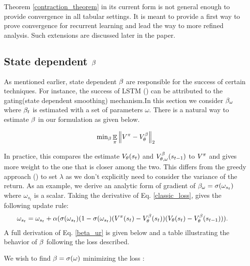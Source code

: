 Theorem \ref{contraction_theorem} in its current form is not general enough to provide convergence in all tabular settings. It is meant to provide a first way to prove convergence for recurrent learning and lead the way to more refined analysis. Such extensions are discussed later in the paper.





\subsection{State dependent $\beta$}
As mentioned earlier, state dependent $\beta$ are responsible for the success of certain techniques. For instance, the success of LSTM (\cite{hochreiter1997long}) can be attributed to the gating(state dependent smoothing) mechanism.In this section we consider $\beta_{\omega}$ where $\beta_t$ is estimated with a set of parameters $\omega$. There is a natural way to estimate $\beta$ in our formulation as given below.

\begin{equation}\label{classic_loss}
    \text{min}_{\beta} \mathop{\mathbb{E}}_{\pi}\left\lVert V^{\pi}-V^{\beta}_{\theta}\right\rVert_{2}
\end{equation}

In practice, this compares the estimate $V_{\theta}(s_t)$ and $V^{\beta}_{\theta,\omega}(s_{t-1})$ to $V^{\pi}$ and gives more weight to the one that is closer among the two. This differs from the greedy approach (\cite{white2016greedy}) to set $\lambda$ as we don't explicitly need to consider the variance of the return.
As an example, we derive an analytic form of gradient of $\beta_{\omega} = \sigma(\omega_{s_t})$ where $\omega_{s_t}$ is a scalar. Taking the derivative of Eq. \ref{classic_loss}, gives the following update rule:
\begin{equation}
\begin{split}
    \omega_{s_t} &= \omega_{s_t} + \alpha ( \sigma (\omega_{s_t})(1 -  \sigma(\omega_{s_t}) (V^{\pi}(s_t) -V^{\beta}_{\theta}(s_t) )(V_{\theta}(s_t) - V^{\beta}_{\theta}(s_{t-1}))).  \label{beta_ur}
\end{split}
\end{equation}
A full derivation of Eq. \ref{beta_ur} is given below and a table illustrating the behavior of $\beta$ following the loss described.

We wish to find $\beta = \sigma(\omega)$ minimizing the loss : 

